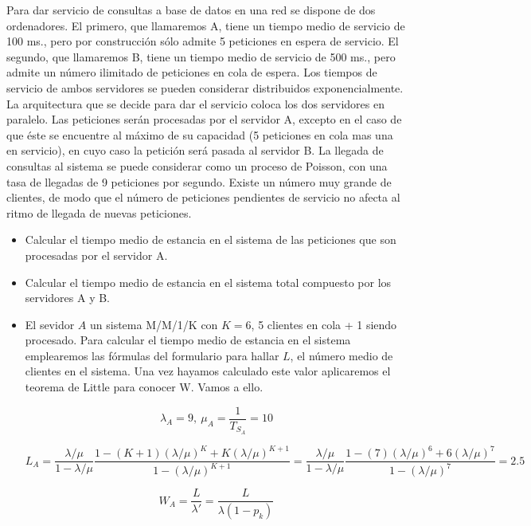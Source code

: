 
\begin{problem}[12]
Para dar servicio de consultas a base de datos en una red se dispone de dos ordenadores. El primero, que llamaremos A, tiene un tiempo medio de servicio de 100 ms., pero por construcción sólo admite 5 peticiones en espera de servicio. El segundo, que llamaremos B, tiene un tiempo medio de servicio de 500 ms., pero admite un número ilimitado de peticiones en cola de espera. Los tiempos de servicio de ambos servidores se pueden considerar distribuidos exponencialmente. La arquitectura que se decide para dar el servicio coloca los dos servidores en paralelo. Las peticiones serán procesadas por el servidor A, excepto en el caso de que éste se encuentre al máximo de su capacidad (5 peticiones en cola mas una en servicio), en cuyo caso la petición será pasada al servidor B. La llegada de consultas al sistema se puede considerar como un proceso de Poisson, con una tasa de llegadas de 9 peticiones por segundo. Existe un número muy grande de clientes, de modo que el número de peticiones pendientes de servicio no afecta al ritmo de llegada de nuevas peticiones.

\begin{itemize}
\item Calcular el tiempo medio de estancia en el sistema de las peticiones que son procesadas por el servidor A.
\item Calcular el tiempo medio de estancia en el sistema total compuesto por los servidores A y B.
\end{itemize}


\newpage
\solution

\begin{itemize}
\item
El sevidor $A$ un sistema M/M/1/K con $K=6$, 5 clientes en cola + 1 siendo procesado. Para calcular el tiempo medio de estancia en el sistema emplearemos las fórmulas del formulario para hallar $L$, el número medio de clientes en el sistema. Una vez hayamos calculado este valor aplicaremos el teorema de Little para conocer W. Vamos a ello.

\[λ_A = 9, \ μ_A=\frac{1}{T_{S_A}}=10\]

\[L_A = \frac{λ/μ}{1-λ/μ}\frac{1-(K+1)(λ/μ)^K+K(λ/μ)^{K+1}}{1-(λ/μ)^{K+1}}=\frac{λ/μ}{1-λ/μ}\frac{1-(7)(λ/μ)^6+6(λ/μ)^{7}}{1-(λ/μ)^{7}}=2.5\]

\[W_A = \frac{L}{λ'}=\frac{L}{λ(1-p_k)}\]


\end{itemize}
\end{problem}
